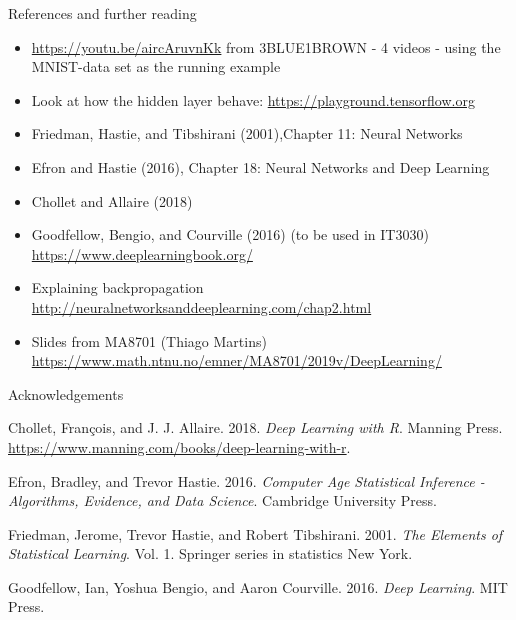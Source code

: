 \documentclass[10pt,ignorenonframetext,]{beamer}
\providecommand{\tightlist}{%
  \setlength{\itemsep}{0pt}\setlength{\parskip}{0pt}}
\begin{document}
\begin{frame}{References and further reading}
\protect\hypertarget{references-and-further-reading}{}

\begin{itemize}
\tightlist
\item
  \url{https://youtu.be/aircAruvnKk} from 3BLUE1BROWN - 4 videos - using
  the MNIST-data set as the running example
\item
  Look at how the hidden layer behave:
  \url{https://playground.tensorflow.org}
\item
  Friedman, Hastie, and Tibshirani (2001),Chapter 11: Neural Networks
\item
  Efron and Hastie (2016), Chapter 18: Neural Networks and Deep Learning
\item
  Chollet and Allaire (2018)
\item
  Goodfellow, Bengio, and Courville (2016) (to be used in IT3030)
  \url{https://www.deeplearningbook.org/}
\item
  Explaining backpropagation
  \url{http://neuralnetworksanddeeplearning.com/chap2.html}
\item
  Slides from MA8701 (Thiago Martins)
  \url{https://www.math.ntnu.no/emner/MA8701/2019v/DeepLearning/}
\end{itemize}

\end{frame}

\begin{frame}{Acknowledgements}
\protect\hypertarget{acknowledgements-1}{}

\hypertarget{refs}{}
\leavevmode\hypertarget{ref-kerasR}{}%
Chollet, François, and J. J. Allaire. 2018. \emph{Deep Learning with R}.
Manning Press. \url{https://www.manning.com/books/deep-learning-with-r}.

\leavevmode\hypertarget{ref-casi}{}%
Efron, Bradley, and Trevor Hastie. 2016. \emph{Computer Age Statistical
Inference - Algorithms, Evidence, and Data Science}. Cambridge
University Press.

\leavevmode\hypertarget{ref-ESL}{}%
Friedman, Jerome, Trevor Hastie, and Robert Tibshirani. 2001. \emph{The
Elements of Statistical Learning}. Vol. 1. Springer series in statistics
New York.

\leavevmode\hypertarget{ref-goodfellow}{}%
Goodfellow, Ian, Yoshua Bengio, and Aaron Courville. 2016. \emph{Deep
Learning}. MIT Press.

\end{frame}
\end{document}
